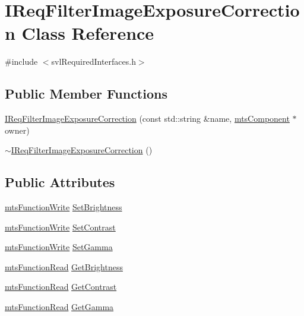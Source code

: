 \hypertarget{class_i_req_filter_image_exposure_correction}{}\section{I\+Req\+Filter\+Image\+Exposure\+Correction Class Reference}
\label{class_i_req_filter_image_exposure_correction}


{\ttfamily \#include $<$svl\+Required\+Interfaces.\+h$>$}

\subsection*{Public Member Functions}
\begin{DoxyCompactItemize}
\item 
\hyperlink{class_i_req_filter_image_exposure_correction_a7216e4ce4ce08e6b617407f69a6bf13c}{I\+Req\+Filter\+Image\+Exposure\+Correction} (const std\+::string \&name, \hyperlink{classmts_component}{mts\+Component} $\ast$owner)
\item 
\hyperlink{class_i_req_filter_image_exposure_correction_a7a63553621a2b3f7958b296b40e91b10}{$\sim$\+I\+Req\+Filter\+Image\+Exposure\+Correction} ()
\end{DoxyCompactItemize}
\subsection*{Public Attributes}
\begin{DoxyCompactItemize}
\item 
\hyperlink{classmts_function_write}{mts\+Function\+Write} \hyperlink{class_i_req_filter_image_exposure_correction_aab5dc4a1893b746eeb20af029f7a0511}{Set\+Brightness}
\item 
\hyperlink{classmts_function_write}{mts\+Function\+Write} \hyperlink{class_i_req_filter_image_exposure_correction_a72a66c9ea243b3702d5f9bd6127a44f8}{Set\+Contrast}
\item 
\hyperlink{classmts_function_write}{mts\+Function\+Write} \hyperlink{class_i_req_filter_image_exposure_correction_aa7eef8c01d176c56c5b2ed5aab3f903e}{Set\+Gamma}
\item 
\hyperlink{classmts_function_read}{mts\+Function\+Read} \hyperlink{class_i_req_filter_image_exposure_correction_a7ea608f2b4bd3510224d43ebc508345b}{Get\+Brightness}
\item 
\hyperlink{classmts_function_read}{mts\+Function\+Read} \hyperlink{class_i_req_filter_image_exposure_correction_a2b4f60e404340b9ce84f32bd560cdcf1}{Get\+Contrast}
\item 
\hyperlink{classmts_function_read}{mts\+Function\+Read} \hyperlink{class_i_req_filter_image_exposure_correction_a2d7fcf152f3396e83b7a828f09c172f4}{Get\+Gamma}
\end{DoxyCompactItemize}


